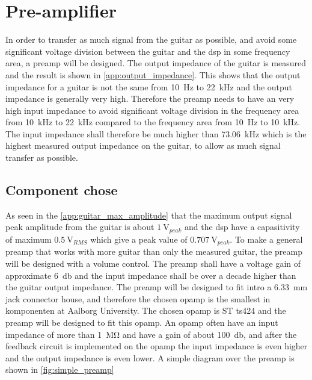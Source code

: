 \section{Pre-amplifier}
In order to transfer as much signal from the guitar as possible, and avoid some significant voltage division between the guitar and the \gls{dsp} in some frequency area, a \gls{preamp} will be designed. The output impedance of the guitar is measured and the result is shown in \autoref{app:output_impedance}. This shows that the output impedance for a guitar is not the same from \SI{10}{\hertz} to \SI{22}{\kilo\hertz} and the output impedance is generally very high. Therefore the \gls{preamp} needs to have an very high input impedance to avoid significant voltage division in the frequency area from \SI{10}{\kilo\hertz} to \SI{22}{\kilo\hertz} compared to the frequency area from \SI{10}{\hertz} to \SI{10}{\kilo\hertz}. The input impedance shall therefore be much higher than \SI{73.06}{\kilo\hertz} which is the highest measured output impedance on the guitar, to allow as much signal transfer as possible.

\subsection{Component chose}

As seen in the \autoref{app:guitar_max_amplitude} that the maximum output signal peak amplitude from the guitar is about $\SI{1}{\volt}_{peak}$ and the 
\gls{dsp} have a capasitivity of maximum $\SI{0.5}{\volt}_{RMS}$ which give a peak value of $\SI{0.707}{\volt}_{peak}$. To make a general \gls{preamp} that works with more guitar than only the measured guitar, the \gls{preamp} will be designed with a volume control. The \gls{preamp} shall have a voltage gain of approximate \SI{6}{\decibel} and the input impedance shall be over a decade higher than the guitar output impedance. The \gls{preamp} will be designed to fit intro a \SI{6.33}{\milli\meter}  jack connector house, and therefore the chosen \gls{opamp} is the smallest in komponenten at Aalborg University. The chosen \gls{opamp} is ST ts424 \citep{TS464} and the \gls{preamp} will be designed to fit this \gls{opamp}. 
	An \gls{opamp} often have an input impedance of more than \SI{1}{\mega\ohm} and have a gain of about \SI{100}{\decibel}, and after the feedback circuit is implemented on the \gls{opamp} the input impedance is even higher and the output impedance is even lower. A simple diagram over the \gls{preamp} is shown in \autoref{fig:simple_preamp} 

